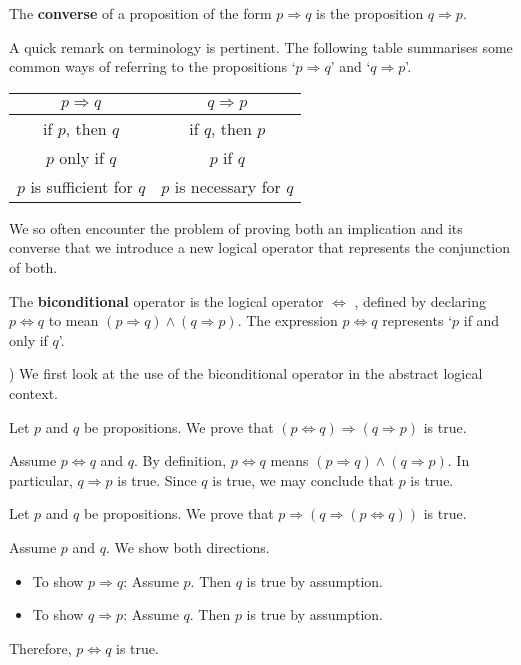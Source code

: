 \begin{definition}
\label{defConverse}
The \textbf{converse} of a proposition of the form $p \Rightarrow q$ is the proposition $q \Rightarrow p$.
\end{definition}

A quick remark on terminology is pertinent. The following table summarises some common ways of referring to the propositions `$p \Rightarrow q$' and `$q \Rightarrow p$'.

\begin{center}
\begin{tabular}{c|c}
$p \Rightarrow q$ & $q \Rightarrow p$ \\ \hline
if $p$, then $q$ & if $q$, then $p$ \\
$p$ only if $q$ & $p$ if $q$ \\
$p$ is sufficient for $q$ & $p$ is necessary for $q$
\end{tabular}
\end{center}

We so often encounter the problem of proving both an implication and its converse that we introduce a new logical operator that represents the conjunction of both.

\begin{definition}
\label{defBiconditional}
The \textbf{biconditional} operator is the logical operator $\Leftrightarrow$ , defined by declaring $p \Leftrightarrow q$ to mean $(p \Rightarrow q) \wedge (q \Rightarrow p)$. The expression $p \Leftrightarrow q$ represents `$p$ if and only if $q$'.
\end{definition}
)
We first look at the use of the biconditional operator in the abstract logical context.

\begin{example}
Let $p$ and $q$ be propositions. We prove that $(p \Leftrightarrow q) \Rightarrow (q \Rightarrow p)$ is true.

Assume $p \Leftrightarrow q$ and $q$. By definition, $p \Leftrightarrow q$ means $(p \Rightarrow q) \wedge (q \Rightarrow p)$. In particular, $q \Rightarrow p$ is true. Since $q$ is true, we may conclude that $p$ is true.
\end{example}

\begin{example}
Let $p$ and $q$ be propositions. We prove that $p \Rightarrow (q \Rightarrow (p \Leftrightarrow q))$ is true.

Assume $p$ and $q$. We show both directions.
\begin{itemize}
  \item To show $p \Rightarrow q$: Assume $p$. Then $q$ is true by assumption.
  \item To show $q \Rightarrow p$: Assume $q$. Then $p$ is true by assumption.
\end{itemize}
Therefore, $p \Leftrightarrow q$ is true.
\end{example}

